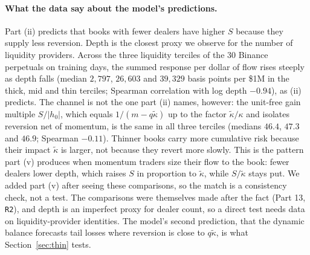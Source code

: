 \paragraph{What the data say about the model's predictions.} Part (ii) predicts that books with fewer dealers have higher $S$ because they supply less reversion. Depth is the closest proxy we observe for the number of liquidity providers. Across the three liquidity terciles of the 30 Binance perpetuals on training days, the summed response per dollar of flow rises steeply as depth falls (median $2{,}797$, $26{,}603$ and $39{,}329$ basis points per \$1M in the thick, mid and thin terciles; Spearman correlation with log depth $-0.94$), as (ii) predicts. The channel is not the one part (ii) names, however: the unit-free gain multiple $S/|h_0|$, which equals $1/(m-q\tilde\kappa)$ up to the factor $\tilde\kappa/\kappa$ and isolates reversion net of momentum, is the same in all three terciles (medians $46.4$, $47.3$ and $46.9$; Spearman $-0.11$). Thinner books carry more cumulative risk because their impact $\tilde\kappa$ is larger, not because they revert more slowly. This is the pattern part (v) produces when momentum traders size their flow to the book: fewer dealers lower depth, which raises $S$ in proportion to $\tilde\kappa$, while $S/\tilde\kappa$ stays put. We added part (v) after seeing these comparisons, so the match is a consistency check, not a test. The comparisons were themselves made after the fact (Part 13, \texttt{R2}), and depth is an imperfect proxy for dealer count, so a direct test needs data on liquidity-provider identities. The model's second prediction, that the dynamic balance forecasts tail losses where reversion is close to $q\tilde\kappa$, is what Section~\ref{sec:thin} tests.
